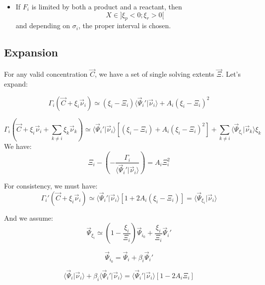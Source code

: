 \documentclass[aps,12pt]{revtex4}
\begin{document}
\begin{itemize}
\begin{itemize}
	\item If $F_i$ is limited by both a product and a reactant, then $$X\in\rbrack \xi_p < 0 ; \xi_r > 0 \lbrack$$
	and depending on $\sigma_i$, the proper interval is chosen.
	\end{itemize}
	
\end{itemize}

\subsection{Expansion}

For any valid concentration $\vec{C}$, we have a set of single solving extents $\vec{\Xi}$.
Let's expand:

\begin{equation}
\Gamma_i(\vec{C} + \xi_i \vec{\nu}_i) \simeq (\xi_i - \Xi_i) \langle \vec{\Psi}_i' \vert \vec{\nu}_i \rangle + A_i (\xi_i - \Xi_i)^2
\end{equation}

\begin{equation}
\Gamma_i(\vec{C} + \xi_i \vec{\nu}_i + \sum_{k\not=i} \xi_k \vec{\nu}_k) \simeq 
\langle \vec{\Psi}_i' \vert \vec{\nu}_i \rangle \left[ (\xi_i - \Xi_i)  + A_i (\xi_i - \Xi_i)^2 \right] + 
\sum_{k\not=i} \langle \vec{\Psi}_{\xi_i} \vert \vec{\nu}_k \rangle \xi_k
\end{equation}
We have:
\begin{equation}
	\Xi_i - \left( - \dfrac{\Gamma_i}{\langle \vec{\Psi}_i' \vert \vec{\nu}_i \rangle}\right) =  A_i \Xi_i^2
\end{equation}


For consistency, we must have:
\begin{equation}
 \Gamma_i'(\vec{C}+\xi_i \vec{\nu}_i) \simeq \langle \vec{\Psi}_i' \vert \vec{\nu}_i \rangle \left[ 1 + 2 A_i \left(\xi_i - \Xi_i\right) \right]
 = \langle \vec{\Psi}_{\xi_i} \vert \vec{\nu}_i \rangle
\end{equation}

And we assume:
\begin{equation}
	\vec{\Psi}_{\xi_i} \simeq \left(1-\dfrac{\xi_i}{\Xi_i}\right) \vec{\Psi}_{i_0} + \dfrac{\xi_i}{\Xi_i} \vec{\Psi}_i'
\end{equation}

\begin{equation}
	\vec{\Psi}_{i_0} = \vec{\Psi}_i + \beta_i \vec{\Psi}_i'
\end{equation}


\begin{equation}
	\langle \vec{\Psi}_i \vert \vec{\nu}_i \rangle + \beta_i \langle  \vec{\Psi}_i' \vert \vec{\nu}_i \rangle
	 = \langle \vec{\Psi}_i' \vert \vec{\nu}_i \rangle \left[ 1 - 2 A_i  \Xi_i\right]
\end{equation}
\end{document}
